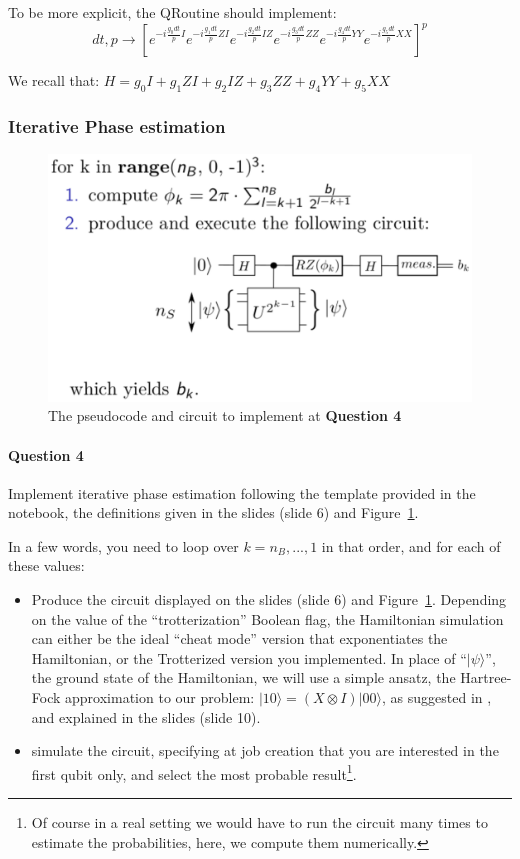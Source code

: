 \documentclass{article}
\begin{document}
To be more explicit, the QRoutine should implement:
$$ dt, p \rightarrow \left[e^{-i\frac{g_{0}dt}{p}I}e^{-i\frac{g_{1}dt}{p}ZI}e^{-i\frac{g_{2}dt}{p}IZ}e^{-i\frac{g_{3}dt}{p}ZZ}e^{-i\frac{g_{4}dt}{p}YY}e^{-i\frac{g_{5}dt}{p}XX}\right]^{p} $$

We recall that: $H=g_{0}I + g_{1}ZI + g_{2}IZ + g_{3}ZZ + g_{4}YY + g_{5}XX$

\subsubsection{Iterative Phase estimation}

\begin{figure}
\centering
\includegraphics[width=.6\textwidth]{pseudo_code.eps}
\caption{The pseudocode and circuit to implement at \textbf{Question 4}}
\label{pseudocode}
\end{figure}

\paragraph{Question 4} Implement iterative phase estimation following the template provided in the notebook, 
the definitions given in the slides (slide 6) and Figure~\ref{pseudocode}.

In a few words, you need to loop over $k=n_{B},...,1$ in that order, and for each of these values:
\begin{itemize}
\item Produce the circuit displayed on the slides (slide 6) and Figure~\ref{pseudocode}. 
Depending on the value of the ``trotterization'' Boolean
flag, the Hamiltonian simulation can either be the ideal ``cheat mode'' version that exponentiates the Hamiltonian,
or the Trotterized version you implemented. In place of ``$|\psi\rangle$'', the ground state of the Hamiltonian,
we will use a simple ansatz, the Hartree-Fock approximation to our problem: $|10\rangle=(X\otimes I)|00\rangle$, as suggested in
\textcolor{blue}{\cite{o2016scalable}}, and explained in the slides (slide 10).
\item simulate the circuit, specifying at job creation that you are interested in the first qubit only, and 
select the most probable result\footnote{Of course in a real setting we would have to run the circuit many times
to estimate the probabilities, here, we compute them numerically.}.
\end{itemize}
\end{document}

